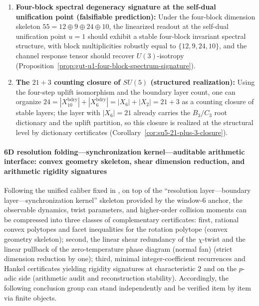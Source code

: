 \begin{theorem}
\begin{enumerate}
  \item \textbf{Four-block spectral degeneracy signature at the self-dual unification point (falsifiable prediction):}
  Under the four-block dimension skeleton \(55=12\oplus 9\oplus 24\oplus 10\), the linearized readout at the self-dual unification point \(u=1\) should exhibit a stable four-block invariant spectral structure, with block multiplicities robustly equal to \(\{12,9,24,10\}\), and the channel response tensor should recover \(U(3)\)-isotropy (Proposition~\ref{prop:gut-u1-four-block-spectrum-signature}).

  \item \textbf{The \(21+3\) counting closure of \texorpdfstring{$SU(5)$}{SU(5)} (structured realization):}
  Using the four-step uplift isomorphism and the boundary layer count, one can organize
  \(
  24=|X_{10}^{\mathrm{bdry}}|+|X_6^{\mathrm{bdry}}|
  =|X_6|+|X_2|=21+3
  \)
  as a counting closure of stable layers; the layer with \(|X_6|=21\) already carries the \(B_3/C_3\) root dictionary and the uplift partition, so this closure is realized at the structural level by dictionary certificates (Corollary~\ref{cor:su5-21-plus-3-closure}).
\end{enumerate}
\end{theorem}

\paragraph{6D resolution folding---synchronization kernel---auditable arithmetic interface: convex geometry skeleton, shear dimension reduction, and arithmetic rigidity signatures}
Following the unified caliber fixed in \cite{Internal2026POMGenerativeAddressThreeRegisterBridgeRH}, on top of the ``resolution layer---boundary layer---synchronization kernel'' skeleton provided by the window-\(6\) anchor, the observable dynamics, twist parameters, and higher-order collision moments can be compressed into three classes of complementary certificates: first, rational convex polytopes and facet inequalities for the rotation polytope (convex geometry skeleton); second, the linear shear redundancy of the \(\chi\)-twist and the linear pullback of the zero-temperature phase diagram (normal fan) (strict dimension reduction by one); third, minimal integer-coefficient recurrences and Hankel certificates yielding rigidity signatures at characteristic \(2\) and on the \(p\)-adic side (arithmetic audit and reconstruction stability). Accordingly, the following conclusion group can stand independently and be verified item by item via finite objects.

